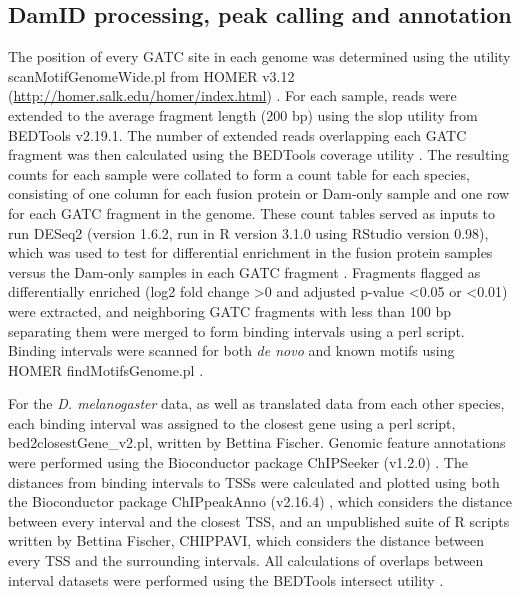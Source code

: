 \subsection{DamID processing, peak calling and annotation}
The position of every GATC site in each genome was determined using the utility scanMotifGenomeWide.pl from HOMER v3.12 (\url{http://homer.salk.edu/homer/index.html}) \citep{heinz_simple_2010}. For each sample, reads were extended to the average fragment length (200 bp) using the slop utility from BEDTools v2.19.1. The number of extended reads overlapping each GATC fragment was then calculated using the BEDTools coverage utility \citep{quinlan_bedtools:_2010}. The resulting counts for each sample were collated to form a count table for each species, consisting of one column for each fusion protein or Dam-only sample and one row for each GATC fragment in the genome. These count tables served as inputs to run DESeq2 (version 1.6.2, run in R version 3.1.0 using RStudio version 0.98), which was used to test for differential enrichment in the fusion protein samples versus the Dam-only samples in each GATC fragment \citep{love_moderated_2014}. Fragments flagged as differentially enriched (log2 fold change \textgreater 0 and adjusted p-value \textless 0.05 or \textless 0.01) were extracted, and neighboring GATC fragments with less than 100 bp separating them were merged to form binding intervals using a perl script. Binding intervals were scanned for both \emph{de novo} and known motifs using HOMER \mbox{findMotifsGenome.pl} \citep{heinz_simple_2010}.

For the \emph{D. melanogaster} data, as well as translated data from each other species, each binding interval was assigned to the closest gene using a perl script, \\bed2closestGene\_v2.pl, written by Bettina Fischer. Genomic feature annotations were performed using the Bioconductor package ChIPSeeker (v1.2.0) \citep{yu_chipseeker_2014}. The distances from binding intervals to TSSs were calculated and plotted using both the Bioconductor package ChIPpeakAnno (v2.16.4) \citep{zhu_chippeakanno:_2010}, which considers the distance between every interval and the closest TSS, and an unpublished suite of R scripts written by Bettina Fischer, CHIPPAVI, which considers the distance between every TSS and the surrounding intervals. All calculations of overlaps between interval datasets were performed using the BEDTools intersect utility \citep{quinlan_bedtools:_2010}.

